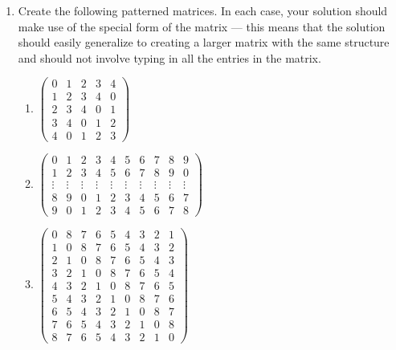 \documentclass[11pt,a4paper]{article}
\begin{document}
\begin{enumerate}
	\item Create the following patterned matrices. In each case, your solution should make use of the special form of the matrix --- this means that the solution should easily generalize to creating a larger matrix with the same structure and should not involve typing in all the entries in the matrix. 
	\setlength\columnsep{0cm}
	
	\begin{multicols}{2}
		\begin{enumerate}
			\everymath{\displaystyle}  
			\item $\begin{pmatrix}
				0 & 1 & 2 & 3 & 4 \\
				1 & 2 & 3 & 4 & 0 \\ 
				2 & 3 & 4 & 0 & 1 \\
				3 & 4 & 0 & 1 & 2 \\ 
				4 & 0 & 1 & 2 & 3
			\end{pmatrix}$
			
			\item $\begin{pmatrix}
				0 & 1 & 2 & 3 & 4 & 5 & 6 & 7 & 8 & 9\\ 
				1 & 2 & 3 & 4 & 5 & 6 & 7 & 8 & 9 & 0\\ 
				\vdots & \vdots & \vdots & \vdots & \vdots & \vdots & \vdots & \vdots & \vdots & \vdots\\ 
				8 & 9 & 0 & 1 & 2 & 3 & 4 & 5 & 6 & 7\\ 
				9 & 0 & 1 & 2 & 3 & 4 & 5 & 6 & 7 & 8
			\end{pmatrix}$
			
			\item $\begin{pmatrix}
				0 & 8 & 7 & 6 & 5 & 4 & 3 & 2 & 1 \\ 
				1 & 0 & 8 & 7 & 6 & 5 & 4 & 3 & 2 \\ 
				2 & 1 & 0 & 8 & 7 & 6 & 5 & 4 & 3 \\ 
				3 & 2 & 1 & 0 & 8 & 7 & 6 & 5 & 4 \\ 
				4 & 3 & 2 & 1 & 0 & 8 & 7 & 6 & 5 \\
				5 & 4 & 3 & 2 & 1 & 0 & 8 & 7 & 6 \\
				6 & 5 & 4 & 3 & 2 & 1 & 0 & 8 & 7 \\
				7 & 6 & 5 & 4 & 3 & 2 & 1 & 0 & 8 \\
				8 & 7 & 6 & 5 & 4 & 3 & 2 & 1 & 0
			\end{pmatrix}$
				\end{enumerate}
	\end{multicols}
	

\end{enumerate}
\end{document}
